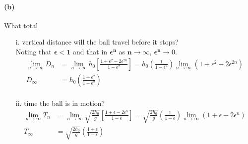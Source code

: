 \documentclass[]{article}
\begin{document}
{		\paragraph{(b)} What total	
		\begin{enumerate}[label=\roman*,topsep=0pt]
			\item[i.] vertical distance will the ball travel before it stops? \\
				Noting that $\bm{\epsilon < 1}$ and that in $\bm{\epsilon^n}$ as $\bm{n\to\infty}$, $\bm{\epsilon^n}\to 0$.
				\begin{equation*}
					\begin{split}
						\lim_{n\to\infty} D_n &= \lim_{n\to\infty} h_0 \left[ \frac{1 + \epsilon^2 - 2\epsilon^{2n}}{1 - \epsilon^2} \right]
						= h_0 \left( \frac{1}{1 - \epsilon^2} \right) \lim_{n\to\infty} (1 + \epsilon^2 - 2\epsilon^{2n}) \\
						D_{\infty} &= h_0 \left( \frac{1 + \epsilon^2}{1 - \epsilon^2} \right) \\
					\end{split}
				\end{equation*} 				
			\item[ii.] time the ball is in motion? \\
			\begin{equation*}
				\begin{split}
					\lim_{n\to\infty} T_n &= \lim_{n\to\infty} \sqrt{\frac{2h_0}{g}} \left[ \frac{1 + \epsilon - 2\epsilon^n}{1 - \epsilon} \right] 
					= \sqrt{\frac{2h_0}{g}} \left( \frac{1}{1 - \epsilon} \right) \lim_{n\to\infty} (1 + \epsilon - 2\epsilon^n) \\
					T_{\infty} &= \sqrt{\frac{2h_0}{g}} \left( \frac{1 + \epsilon}{1 - \epsilon} \right) \\
				\end{split}
			\end{equation*}
		\end{enumerate}
	
}
\end{document}
